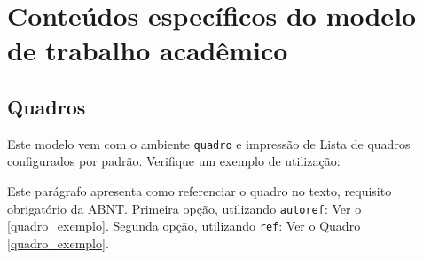 
\chapter{Conteúdos específicos do modelo de trabalho acadêmico}\label{cap_trabalho_academico}

\section{Quadros}

Este modelo vem com o ambiente \texttt{quadro} e impressão de Lista de quadros
configurados por padrão. Verifique um exemplo de utilização:


Este parágrafo apresenta como referenciar o quadro no texto, requisito
obrigatório da ABNT.
Primeira opção, utilizando \texttt{autoref}: Ver o \autoref{quadro_exemplo}.
Segunda opção, utilizando  \texttt{ref}: Ver o Quadro \ref{quadro_exemplo}.

